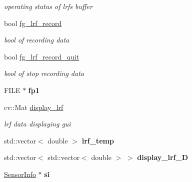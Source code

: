 \begin{DoxyCompactItemize}
\begin{DoxyCompactList}\small\item\em operating status of lrf\textquotesingle{}s buffer \end{DoxyCompactList}\item 
\hypertarget{class_main_window_acdad68b9a5c7b52047cf68f3e6263f90}{}bool \hyperlink{class_main_window_acdad68b9a5c7b52047cf68f3e6263f90}{fg\+\_\+lrf\+\_\+record}\label{class_main_window_acdad68b9a5c7b52047cf68f3e6263f90}

\begin{DoxyCompactList}\small\item\em bool of recording data \end{DoxyCompactList}\item 
\hypertarget{class_main_window_a57a88f831eed7afa81064d274c01549a}{}bool \hyperlink{class_main_window_a57a88f831eed7afa81064d274c01549a}{fg\+\_\+lrf\+\_\+record\+\_\+quit}\label{class_main_window_a57a88f831eed7afa81064d274c01549a}

\begin{DoxyCompactList}\small\item\em bool of stop recording data \end{DoxyCompactList}\item 
\hypertarget{class_main_window_adc556dc0a909538236b0ba4126336eb5}{}F\+I\+L\+E $\ast$ {\bfseries fp1}\label{class_main_window_adc556dc0a909538236b0ba4126336eb5}

\item 
\hypertarget{class_main_window_a526afc9bb96e26cccbc074ed30c7c386}{}cv\+::\+Mat \hyperlink{class_main_window_a526afc9bb96e26cccbc074ed30c7c386}{display\+\_\+lrf}\label{class_main_window_a526afc9bb96e26cccbc074ed30c7c386}

\begin{DoxyCompactList}\small\item\em lrf data displaying gui \end{DoxyCompactList}\item 
\hypertarget{class_main_window_a18fafd7d6c2d9b83a686156421bb54b5}{}std\+::vector$<$ double $>$ {\bfseries lrf\+\_\+temp}\label{class_main_window_a18fafd7d6c2d9b83a686156421bb54b5}

\item 
\hypertarget{class_main_window_ae02456cfb685af6293c97d67df860d64}{}std\+::vector$<$ std\+::vector$<$ double $>$ $>$ {\bfseries display\+\_\+lrf\+\_\+D}\label{class_main_window_ae02456cfb685af6293c97d67df860d64}

\item 
\hypertarget{class_main_window_a752245011087dd3e391e62da45445ccb}{}\hyperlink{class_sensor_info}{Sensor\+Info} $\ast$ {\bfseries si}\label{class_main_window_a752245011087dd3e391e62da45445ccb}


\end{DoxyCompactItemize}
